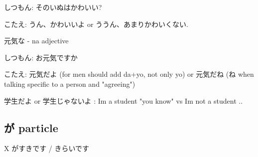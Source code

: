 しつもん: そのいぬはかわいい?

こたえ: うん、かわいいよ or ううん、あまりかわいくない.

元気な - na adjective

しつもん: お元気ですか

こたえ: 元気だよ (for men should add da+yo, not only yo) or 元気だね (ね when talking specific to a person and "agreeing")

学生だよ or 学生じゃないよ : Im a student "you know" vs Im not a student ..

\subsection{が particle}
X がすきです / きらいです










